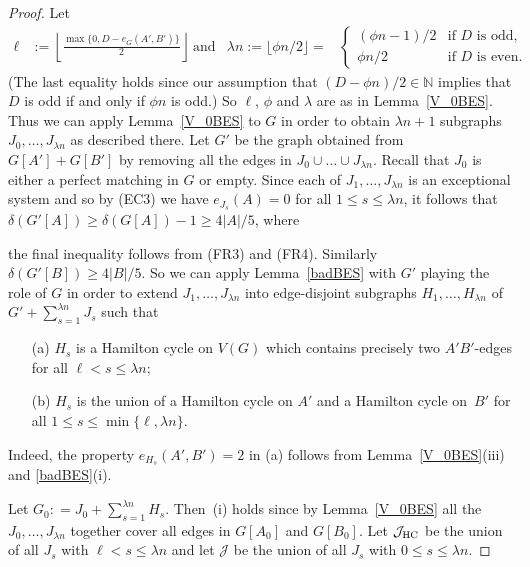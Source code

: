 \documentclass{memo-l}
\def\COMMENT#1{}
\numberwithin{section}{chapter}
\numberwithin{equation}{section}
\numberwithin{firstthm}{section}
\numberwithin{figure}{section}
\begin{document}
\begin{proof}
Let
\begin{align*}
\ell & := \left\lfloor \frac{ \max \{0 , D - e_G(A',B') \} }2 \right\rfloor \  \text{and}  
& \lambda n := \lfloor \phi n /2 \rfloor = & \begin{cases} 
(\phi n -1)/2 & \textrm{if $D$ is odd,}\\
\phi n/2  & \textrm{if $D$ is even.}
\end{cases}
\end{align*}
(The last equality holds since our assumption that $(D- \phi n )/2 \in \mathbb{N}$
implies that $D$ is odd if and only if $\phi n$ is odd.)
So $\ell$, $\phi $ and $\lambda$ are as in Lemma~\ref{V_0BES}.
Thus we can apply Lemma~\ref{V_0BES} to $G$ in order to obtain $\lambda n +1$ subgraphs $J_0, \dots ,J_{\lambda n}$ as described there.
Let $G'$ be the graph obtained from $G[A']+G[B']$ by removing all the edges in $J_0 \cup \dots \cup J_{\lambda n}$.
Recall that $J_0$ is either a perfect matching in $G$ or empty. 
Since each of $J_1, \dots ,J_{\lambda n}$ is an exceptional system and so by (EC3) we have $e_{J_s}(A)=0$ for all $1\le s \le \lambda n$,
it follows that $\delta(G'[A])\ge \delta(G[A])-1\ge 4|A|/5$, where%
   \COMMENT{Daniela: had $\delta(G'[A])\ge \delta(G[A])-1\ge \delta(G[A'])-|A_0|-1\ge 4|A|/5$, but then the last inequality is wrong}
the final inequality follows from (FR3) and (FR4).
Similarly $\delta(G'[B])\ge 4|B|/5$.
So we can apply Lemma~\ref{badBES} with $G'$ playing the role of $G$ in order to extend $J_1, \dots ,J_{\lambda n }$ into
edge-disjoint subgraphs $H_1, \dots ,H_{\lambda n }$ of $G'+ \sum_{s=1}^{\lambda n} J_s$
such that
\begin{itemize}
\item[(a)] $H_s$ is a Hamilton cycle on $V(G)$ which contains precisely two $A'B'$-edges for all $\ell<s\le \lambda n$;
\item[(b)] $H_s$ is the union of a Hamilton cycle on $A'$ and a Hamilton cycle on~$B'$ for all $1\le s\le \min \{ \ell,\lambda n \}$.
\end{itemize}
Indeed, the property $e_{H_s}(A',B')=2$ in (a) follows from Lemma~\ref{V_0BES}(iii) and \ref{badBES}(i).%
   \COMMENT{Daniela: new sentence}
Let $G_0: = J_0 + \sum_{s=1}^{\lambda n} H_s$.
Then~(i) holds since by Lemma~\ref{V_0BES} all the $J_0, \dots ,J_{\lambda n}$ together
cover all edges in $G[A_0]$ and $G[B_0]$.
Let $\mathcal{J}_{\rm HC}$ be the union of all $J_s$ with $\ell<s\le \lambda n$ and
let $\mathcal{J}$ be the union of all $J_s$ with $0\le s\le \lambda n$.

\end{proof}
\end{document}
